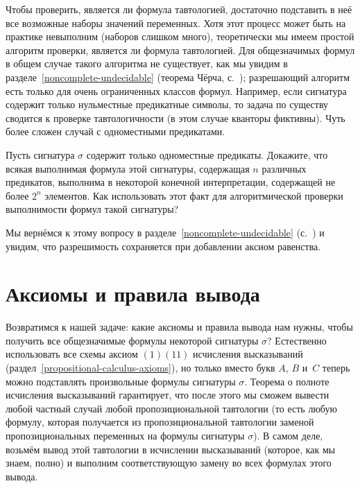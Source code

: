 Чтобы проверить, является ли формула тавтологией, достаточно
подставить в неё все возможные наборы значений переменных. Хотя
этот процесс может быть на практике невыполним (наборов слишком
много), теоретически мы имеем простой алгоритм проверки,
является ли формула тавтологией. Для общезначимых формул в общем
случае такого алгоритма не существует, как мы увидим в
разделе~\ref{noncomplete-undecidable} (теорема Чёрча,
с.~\pageref{church-theorem});%
разрешающий алгоритм есть только для очень ограниченных классов
формул. Например, если сигнатура содержит только нульместные
предикатные символы, то задача по существу сводится к проверке
тавтологичности (в этом случае кванторы фиктивны). Чуть более
сложен случай с одноместными предикатами.

\begin{problem}
Пусть сигнатура $\sigma$ содержит только одноместные предикаты.
Докажите, что всякая выполнимая формула этой сигнатуры,
содержащая $n$ различных предикатов, выполнима в некоторой
конечной интерпретации, содержащей не более $2^n$ элементов. Как
использовать этот факт для алгоритмической проверки выполнимости
формул такой сигнатуры?
\end{problem}

Мы вернёмся к этому вопросу в
разделе~\ref{noncomplete-undecidable}
(с.~\pageref{unary-equality}) и увидим, что разрешимость
сохраняется при добавлении аксиом равенства.

\section{Аксиомы и правила вывода}

Возвратимся к нашей задаче: какие аксиомы и правила вывода нам
нужны, чтобы получить все общезначимые формулы некоторой
сигнатуры $\sigma$? Естественно использовать все схемы аксиом
$(1)$\ч$(11)$ исчисления высказываний%
(раздел~\ref{propositional-calculus-axioms}), но только вместо
букв $A$, $B$ и~$C$ теперь можно подставлять произвольные
формулы сигнатуры $\sigma$. Теорема о полноте исчисления
высказываний гарантирует, что после этого мы сможем вывести
любой частный случай любой пропозициональной тавтологии (то есть
любую формулу, которая получается из пропозициональной
тавтологии заменой пропозициональных переменных на формулы
сигнатуры $\sigma$). В самом деле, возьмём вывод этой
тавтологии в исчислении высказываний (которое, как мы знаем,
полно) и выполним соответствующую замену во всех формулах этого
вывода.

